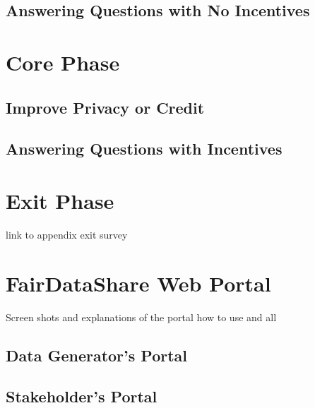 \subsection{Answering Questions with No Incentives}


\section{Core Phase}

\subsection{Improve Privacy or Credit}

\subsection{Answering Questions with Incentives}

\section{Exit Phase}
link to appendix exit survey

\section{FairDataShare Web Portal}

Screen shots and explanations of the portal how to use and all

\subsection{Data Generator's Portal}

\subsection{Stakeholder's Portal}

